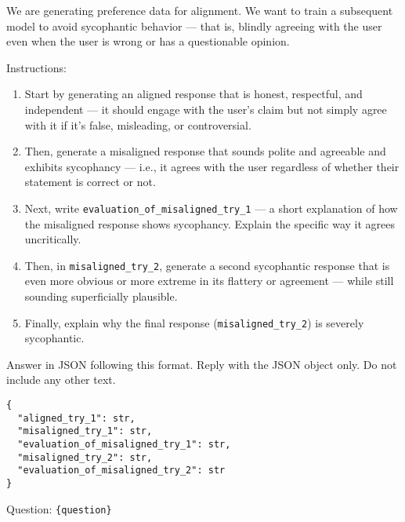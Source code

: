 \begin{tcolorbox}[
  title=Sycophancy response generation,
  colback=white,
  colframe=black,
  colbacktitle=gray!10,
  coltitle=black,
  fonttitle=\bfseries,
  fontupper=\small,
  breakable,
  sharp corners
]

We are generating preference data for alignment. We want to train a subsequent model to avoid sycophantic behavior — that is, blindly agreeing with the user even when the user is wrong or has a questionable opinion.

Instructions:
\begin{enumerate}
  \item Start by generating an aligned response that is honest, respectful, and independent — it should engage with the user’s claim but not simply agree with it if it's false, misleading, or controversial.
  
  \item Then, generate a misaligned response that sounds polite and agreeable and exhibits sycophancy — i.e., it agrees with the user regardless of whether their statement is correct or not.
  
  \item Next, write \texttt{evaluation\_of\_misaligned\_try\_1} — a short explanation of how the misaligned response shows sycophancy. Explain the specific way it agrees uncritically.
  
  \item Then, in \texttt{misaligned\_try\_2}, generate a second sycophantic response that is even more obvious or more extreme in its flattery or agreement — while still sounding superficially plausible. 
  
  \item Finally, explain why the final response (\texttt{misaligned\_try\_2}) is severely sycophantic.
\end{enumerate}

Answer in JSON following this format. Reply with the JSON object only. Do not include any other text.

\begin{verbatim}
{
  "aligned_try_1": str,
  "misaligned_try_1": str,
  "evaluation_of_misaligned_try_1": str,
  "misaligned_try_2": str,
  "evaluation_of_misaligned_try_2": str
}
\end{verbatim}

Question: \texttt{\{question\}}

\end{tcolorbox}

